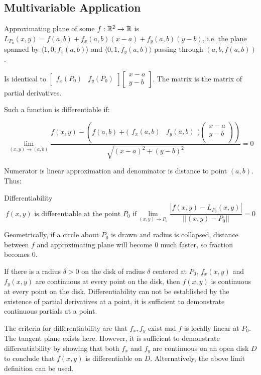\subsection{Multivariable Application}

Approximating plane of some $f:\mathbb{R}^2\to \mathbb{R}$ is $L_{P_0}(x,y)=f(a,b)+f_x(a,b)(x-a)+f_y(a,b)(y-b)$, i.e. the plane spanned by
$\langle 1,0,f_x(a,b)\rangle$ and $\langle 0,1,f_y(a,b)\rangle$ passing through $(a,b,f(a,b))$.

Is identical to $\begin{bmatrix}f_x(P_0)&f_y(P_0)\end{bmatrix}\begin{bmatrix}x-a\\y-b\end{bmatrix}$. The matrix is the matrix of partial derivatives.

Such a function is differentiable if:

\[\displaystyle \lim_{(x,y)\to(a,b)}\frac{f(x,y)-\left(f(a,b)+\Big(\begin{matrix} f_x(a,b)&f_y(a,b) \end{matrix} \Big)\left(\begin{matrix}x-a\\y-b\\ \end{matrix} \right) \right)}{\sqrt{(x-a)^2+(y-b)^2}}=0\]

Numerator is linear approximation and denominator is distance to point $(a,b)$. Thus:

\begin{mybox}{Differentiability}
\[f(x,y) \mbox{ is differentiable at the point }P_0\mbox{ if}\displaystyle \lim_{(x,y)\to P_0}\frac{|f(x,y)-L_{P_0}(x,y)|}{||(x,y)-P_0||}=0\]
\end{mybox}

Geometrically, if a circle about $P_0$ is drawn and radius is collapsed, distance between $f$ and approximating plane will become 0 much faster, so fraction becomes 0.

If there is a radius $\delta > 0$ on the disk of radius $\delta$ centered at $P_0$, $f_x(x,y)$ and $f_y(x,y)$ are continuous at every point on the disk, then $f(x,y)$ is continuous at every point on the disk.
Differentiability can not be established by the existence of partial derivatives at a point, it is sufficient to demonstrate continuous partials
at a point.

The criteria for differentiability are that $f_x,f_y$ exist and $f$ is locally linear at $P_0$. The tangent plane exists here. However,
it is sufficient to demonstrate differentiability by showing that both $f_x$ and $f_y$ are continuous on an open disk $D$ to conclude that $f(x,y)$
is differentiable on $D$. Alternatively, the above limit definition can be used.

